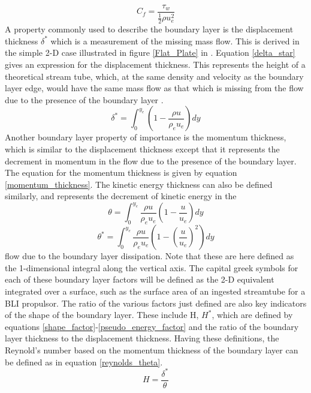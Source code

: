\begin{equation} C_f = \frac{\tau_w}{\frac{1}{2}\rho u_e^2}\label{skin_friction}\end{equation}
%
A property commonly used to describe the boundary layer is the displacement thickness $\delta^*$ which is a measurement of the missing mass flow.  This is derived in the simple 2-D case illustrated in figure \ref{Flat_Plate} in \cite{Anderson2001}. Equation \ref{delta_star} gives an expression for the displacement thickness.  This represents the height of a theoretical stream tube, which, at the same density and velocity as the boundary layer edge, would have the same mass flow as that which is missing from the flow due to the presence of the boundary layer \cite{Anderson2001}.
\begin{equation}\delta^* = \int_0^{y_e} \left(1-\frac{\rho u}{\rho_e u_e}\right)dy\label{delta_star}\end{equation}
Another boundary layer property of importance is the momentum thickness, which is similar to the displacement thickness except that it represents the decrement in momentum in the flow due to the presence of the boundary layer.  The equation for the momentum thickness is given by equation \ref{momentum_thickness}.  The kinetic energy thickness can also be defined similarly, and represents the decrement of kinetic energy in the 
\begin{equation}\theta = \int_0^{y_e} \frac{\rho u}{\rho_e u_e}\left(1-\frac{u}{u_e}\right)dy\label{momentum_thickness}\end{equation}
\begin{equation}\theta^* = \int_0^{y_e} \frac{\rho u}{\rho_e u_e}\left(1-\left(\frac{u}{u_e}\right)^2\right)dy\end{equation}
flow due to the boundary layer dissipation.  Note that these are here defined as the 1-dimensional integral along the vertical axis.  The capital greek symbols for each of these boundary layer factors will be defined as the 2-D equivalent integrated over a surface, such as the surface area of an ingested streamtube for a BLI propulsor.  The ratio of the various factors just defined are also key indicators of the shape of the boundary layer.  These include H, $H^*$, which are defined by equations \ref{shape_factor}-\ref{pseudo_energy_factor} and the ratio of the boundary layer thickness to the displacement thickness.  Having these definitions, the Reynold's number based on the momentum thickness of the boundary layer can be defined as in equation \ref{reynolds_theta}.
\begin{equation} H = \frac{\delta^*}{\theta}\label{shape_factor}\end{equation} 
